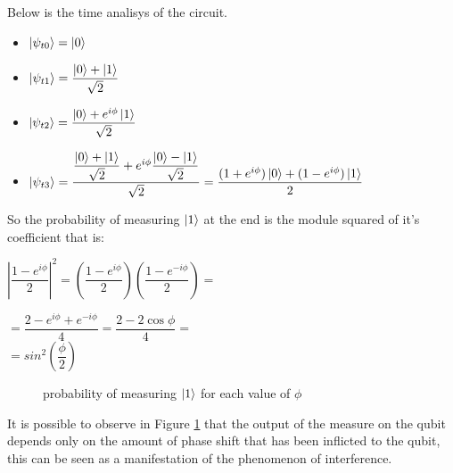 \documentclass{article}
\begin{document}
\noindent Below is the time analisys of the circuit.
\begin{itemize}

	\item $\ket{\psi_{t0}} = \ket{0}$
	\item $\ket{\psi_{t1}} = \dfrac{\ket{0}+\ket{1}}{\sqrt{2}}$
	\item $\ket{\psi_{t2}} = \dfrac{\ket{0}+e^{i\phi}\ket{1}}{\sqrt{2}}$
	\item $\ket{\psi_{t3}} = \dfrac{\dfrac{\ket{0}+\ket{1}}{\sqrt{2}}+e^{i\phi}\dfrac{\ket{0}-\ket{1}}
		      {\sqrt{2}}}{\sqrt{2}}   = \dfrac{(1+e^{i\phi})\ket{0}+(1-e^{i\phi})\ket{1}}{2}$




\end{itemize}

\vspace{20pt}
\noindent So the probability of measuring $\ket{1}$ at the end is the module squared of it's\\
coefficient that is:\\
\vspace{10pt}

$\left|\dfrac{1-e^{i\phi}}{2}\right|^2 = \left(\dfrac{1-e^{i\phi}}{2}\right)\left(\dfrac{1-e^{-i\phi}}{2}\right) =$\\
\vspace{5pt}


$ = \dfrac{2-e^{i\phi}+e^{-i\phi}}{4} = \dfrac{2-2\cos{\phi}}{4} =$\\

\vspace{3pt}
$ = sin^2{\left(\dfrac{\phi}{2}\right)}$

\vspace{10pt}



\begin{figure}[H]
	\centering
	\caption{probability of measuring $\ket{1}$ for each value of $\phi$}
	\label{interferencegraph}
\end{figure}
\noindent It is possible to observe in Figure \ref{interferencegraph}
that the output of the measure on the qubit depends only on the
amount of phase shift that has been inflicted
to the qubit, this can be seen as a manifestation of the phenomenon
of interference.
\end{document}
